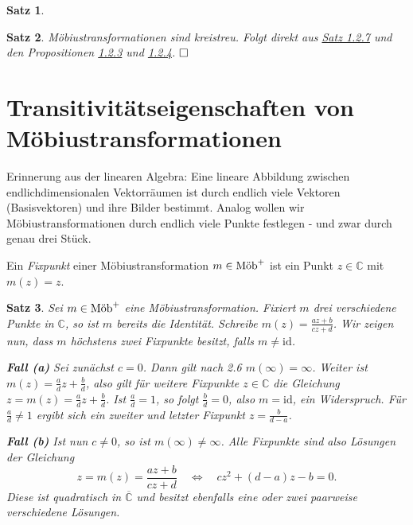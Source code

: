 \documentclass[11pt]{book}
\numberwithin{dummy}{section}
\newtheorem{theorem}{Satz}[section]
\theoremstyle{nonumberbreak}
\newenvironment{defin}[1][]{\ifthenelse{\equal{#1}{}}{\definition}{\definition[#1]}\rm}{\enddefinition}
\newenvironment{pr}[1][]{\ifthenelse{\equal{#1}{}}{\proof}{\proof[#1]}\rm}{\endproof}
\newcommand{\C}{\mathbb{C}}
\newcommand{\CC}{\overline{\mathbb{C}}}
\newcommand{\id}{\mathrm{id}}
\newcommand{\mob}{\textup{Möb}^+}
\begin{document}
\begin{spacing}{1.4}
\begin{theorem}
\end{theorem}

\hypertarget{satzeinszweiacht}{}
\begin{theorem}   %
Möbiustransformationen sind kreistreu.
\begin{pr}
Folgt direkt aus \hyperlink{satzeinszweisieben}{Satz 1.2.7} und den Propositionen \hyperlink{propeinszweidrei}{1.2.3} und \hyperlink{propeinszweivier}{1.2.4}. $\hfill \Box$
\end{pr}
\end{theorem}






\section{Transitivitätseigenschaften von Möbiustransformationen} %



Erinnerung aus der linearen Algebra: Eine lineare Abbildung zwischen endlichdimensionalen Vektorräumen ist durch endlich viele Vektoren (Basisvektoren) und ihre Bilder bestimmt. Analog wollen wir Möbiustransformationen durch endlich viele Punkte festlegen - und zwar durch genau drei Stück.

\begin{defin}     %
Ein \textit{Fixpunkt} einer Möbiustransformation $m \in \mob$ ist ein Punkt $z \in \C$ mit $m(z)=z$.
\end{defin}


\hypertarget{satzeinsdreizwei}{}
\begin{theorem}     %
Sei $m \in \mob$ eine Möbiustransformation. Fixiert $m$ drei verschiedene Punkte in $\C$, so ist $m$ bereits die Identität.
\begin{pr}
Schreibe $m(z)= \frac{az+b}{cz+d}$. Wir zeigen nun, dass $m$ höchstens zwei Fixpunkte besitzt, falls $m \neq \id$.
\begin{compactenum}
\item[\textbf{Fall (a)}]
Sei zunächst $c=0$. Dann gilt nach 2.6 $m(\infty) = \infty$. Weiter ist $m(z) = \frac{a}{d}z + \frac{b}{d}$, also gilt für weitere Fixpunkte $z \in \C$ die Gleichung
$z= m(z) = \frac{a}{d} z + \frac{b}{d}$. Ist $\frac{a}{d} = 1$, so folgt $\frac{b}{d} = 0$, also $m= \id$, ein Widerspruch. Für $\frac{a}{d} \neq 1$ ergibt sich ein zweiter und letzter Fixpunkt $z= \frac{b}{d-a}$.
\item[\textbf{Fall (b)}] Ist nun $c \neq 0$, so ist $m(\infty) \neq \infty$. Alle Fixpunkte sind also Lösungen der Gleichung 
$$z=m(z) = \frac{az+b}{cz+d} \quad \Longleftrightarrow \quad cz^2+(d-a)z - b = 0.$$
Diese ist quadratisch in $\CC$ und besitzt ebenfalls eine oder zwei paarweise verschiedene Lösungen.



\end{compactenum}
\end{pr}
\end{theorem}
\end{spacing}
\end{document}
